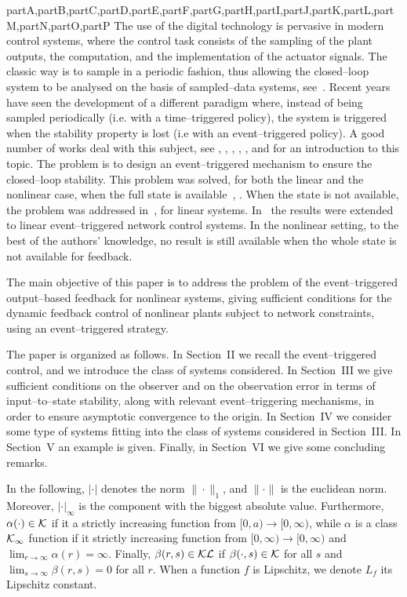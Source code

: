 \documentclass[letterpaper, 10 pt, conference]{ieeeconf}
\def\compile{partA,partB,partC,partD,partE,partF,partG,partH,partI,partJ,partK,partL,partM,partN,partO,partP}
\newenvironment{partA}[1][]{}{}
\begin{document}
\begin{xcomment}{\compile}
\begin{partA}
The use of the digital technology is pervasive in modern control systems, where the control task consists of the sampling of the plant outputs, the computation, and the implementation of the actuator signals. The classic way is to sample in a periodic fashion, thus allowing the closed--loop system to be analysed on the basis of sampled--data systems, see~\cite{Astrom 1997}. Recent years have seen the development of a different paradigm where, instead of being sampled periodically (i.e. with a time--triggered policy), the system is triggered when the stability property is lost (i.e with an event--triggered policy). A good number of works deal with this subject, see \cite{Astrom 2003}, \cite{Tabuada 2007}, \cite{Wang 2011}, \cite{Lunze 2010}, \cite{Heemels 2008}, and \cite{Heemels 2012} for an introduction to this topic. The problem is to design an event--triggered mechanism to ensure the closed--loop stability. This problem was solved, for both the linear and the nonlinear case, when the full state is available~\cite{Tabuada 2007}, \cite{Wang 2011}. When the  state is not available, the problem was addressed in~\cite{Lehmann 2011b}, \cite{Donkers 2012} for linear systems. In~\cite{Tallapragada 2013} the results were extended to linear event--triggered network control systems. In the nonlinear setting, to the best of the authors' knowledge, no result is still available when the whole state is not available for feedback.

The main objective of this paper is to address the problem of the event--triggered output--based feedback for nonlinear systems, giving sufficient conditions for the dynamic feedback control of nonlinear plants subject to network constraints, using an event--triggered strategy.


The paper is organized as follows. In Section~II we recall the event--triggered control, and we introduce the class of systems considered. In Section~III we give sufficient conditions on the observer and on the observation error in terms of input--to--state stability, along with relevant event--triggering mechanisms, in order to ensure asymptotic convergence to the origin. In Section~IV we consider some type of systems fitting into the class of systems considered in Section~III. In Section~V an example is given. Finally, in Section~VI we give some concluding remarks.


\medskip
{} In the following, $|\cdot|$ denotes the norm $\|\cdot\|_1$, and $\|\cdot \|$ is the euclidean norm. Moreover, $|\cdot|_{\infty}$ is the component with the biggest absolute value. Furthermore, $\alpha(\cdot)\in {\cal K}$  if it a strictly increasing function from $[0,a) \to [0,\infty)$, while $\alpha$ is a class ${\cal K}_{\infty}$ function if it  strictly increasing function from $[0,\infty)\to [0,\infty)$ and $\lim_{r\to \infty} \alpha(r)=\infty$. Finally, $\beta(r,s)\in {\cal KL}$ if $\beta(\cdot,s)\in {\cal K}$ for all $s$ and $\lim_{s\to\infty}\beta(r,s)=0$ for all $r$. When a function $f$ is Lipschitz, we denote $L_f$ its Lipschitz constant.


\end{partA}
\end{xcomment}
\end{document}
